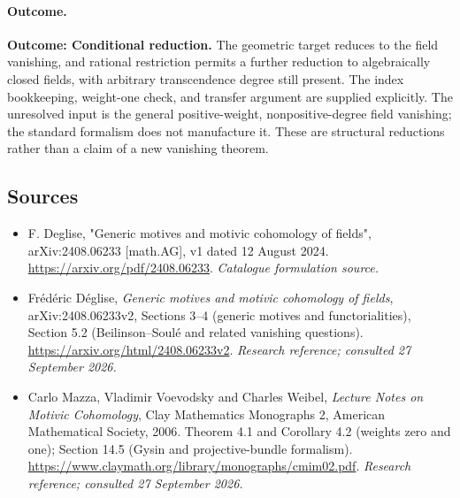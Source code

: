 \documentclass[11pt,a4paper]{article}
\numberwithin{equation}{section}
\begin{document}
\paragraph{Outcome.}
\textbf{Outcome: Conditional reduction.}
The geometric target reduces to the field vanishing, and rational restriction permits a further reduction to algebraically closed fields, with arbitrary transcendence degree still present. The index bookkeeping, weight-one check, and transfer argument are supplied explicitly. The unresolved input is the general positive-weight, nonpositive-degree field vanishing; the standard formalism does not manufacture it. These are structural reductions rather than a claim of a new vanishing theorem.

\subsection{Sources}
\begin{itemize}\raggedright
\item[\textnormal{[S1]}]\hypertarget{source:30006779:1}{} F. Deglise, "Generic motives and motivic cohomology of fields", arXiv:2408.06233 [math.AG], v1 dated 12 August 2024.
\url{https://arxiv.org/pdf/2408.06233}.
{\small\textit{Catalogue formulation source.}}
\item[\textnormal{[E1]}]\hypertarget{extra:30006779:1}{} Fr\'ed\'eric D\'eglise, \emph{Generic motives and motivic cohomology of fields}, arXiv:2408.06233v2, Sections 3--4 (generic motives and functorialities), Section 5.2 (Beilinson--Soul\'e and related vanishing questions).
\url{https://arxiv.org/html/2408.06233v2}.
{\small\textit{Research reference; consulted 27 September 2026.}}
\item[\textnormal{[E2]}]\hypertarget{extra:30006779:2}{} Carlo Mazza, Vladimir Voevodsky and Charles Weibel, \emph{Lecture Notes on Motivic Cohomology}, Clay Mathematics Monographs 2, American Mathematical Society, 2006. Theorem 4.1 and Corollary 4.2 (weights zero and one); Section 14.5 (Gysin and projective-bundle formalism).
\url{https://www.claymath.org/library/monographs/cmim02.pdf}.
{\small\textit{Research reference; consulted 27 September 2026.}}
\end{itemize}
\end{document}
